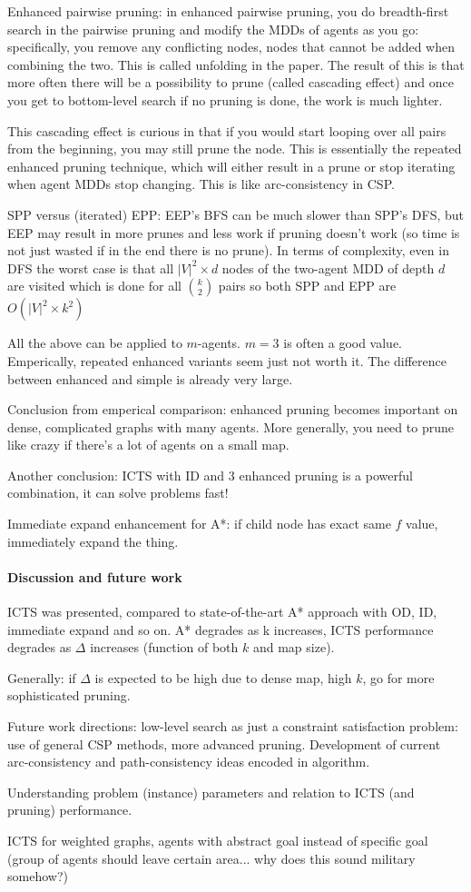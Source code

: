 \documentclass[a4paper,10pt,english]{article}
\begin{document}
	Enhanced pairwise pruning: in enhanced pairwise pruning, you do breadth-first search in the pairwise pruning and modify the MDDs of agents as you go: specifically, you remove any conflicting nodes, nodes that cannot be added when combining the two. This is called unfolding in the paper. The result of this is that more often there will be a possibility to prune (called cascading effect) and once you get to bottom-level search if no pruning is done, the work is much lighter.
	
	This cascading effect is curious in that if you would start looping over all pairs from the beginning, you may still prune the node. This is essentially the repeated enhanced pruning technique, which will either result in a prune or stop iterating when agent MDDs stop changing. This is like arc-consistency in CSP.
	
	SPP versus (iterated) EPP: EEP's BFS can be much slower than SPP's DFS, but EEP may result in more prunes and less work if pruning doesn't work (so time is not just wasted if in the end there is no prune). In terms of complexity, even in DFS the worst case is that all $|V|^2\times d$ nodes of the two-agent MDD of depth $d$ are visited which is done for all $k \choose 2$ pairs so both SPP and EPP are $O(|V|^2\times k^2)$
	
	All the above can be applied to $m$-agents. $m=3$ is often a good value. Emperically, repeated enhanced variants seem just not worth it. The difference between enhanced and simple is already very large. 
	
	Conclusion from emperical comparison: enhanced pruning becomes important on dense, complicated graphs with many agents. More generally, you need to prune like crazy if there's a lot of agents on a small map.
	
	Another conclusion: ICTS with ID and 3 enhanced pruning is a powerful combination, it can solve problems fast!
	
	Immediate expand enhancement for A*: if child node has exact same $f$ value, immediately expand the thing.
	
	\paragraph{Discussion and future work}
	ICTS was presented, compared to state-of-the-art A* approach with OD, ID, immediate expand and so on. A* degrades as k increases, ICTS performance degrades as $\Delta$ increases (function of both $k$ and map size).
	
	Generally: if $\Delta$ is expected to be high due to dense map, high $k$, go for more sophisticated pruning.
	
	Future work directions: low-level search as just a constraint satisfaction problem: use of general CSP methods, more advanced pruning. Development of current arc-consistency and path-consistency ideas encoded in algorithm.
	
	Understanding problem (instance) parameters and relation to ICTS (and pruning) performance.
	
	ICTS for weighted graphs, agents with abstract goal instead of specific goal (group of agents should leave certain area... why does this sound military somehow?)
	\printbibliography
	
\end{document}
